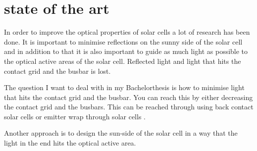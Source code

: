 \section{state of the art}
In order to improve the optical properties of solar cells a lot of research has been done. It is important to minimise reflections on the sunny side of the solar cell and in addition to that it is also important to guide as much light as possible to the optical active areas of the solar cell. 
Reflected light and light that hits the contact grid and the busbar is lost.

The question I want to deal with in my Bachelorthesis is how to minimise light that hits the contact grid and the busbar. You can reach this by either decreasing the contact grid and the busbars. This can be reached through using back contact solar cells \cite{kerschaver2006back} or emitter wrap through solar cells \cite{gee1992emitter}. 

Another approach is to design the sun-side of the solar cell in a way that the light in the end hits the optical active area. 

